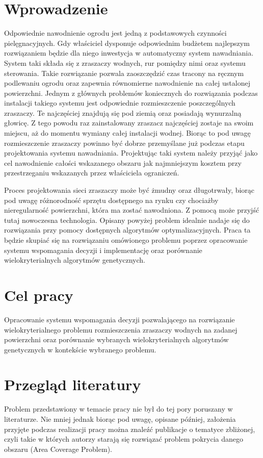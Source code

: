 \documentclass[twoside]{iisthesis}
\begin{document}
\section{Wprowadzenie}
Odpowiednie nawodnienie ogrodu jest jedną z podstawowych czynności pielęgnacyjnych. Gdy właściciel dysponuje odpowiednim budżetem najlepszym rozwiązaniem będzie dla niego inwestycja w automatyczny system nawadniania. System taki składa się z zraszaczy wodnych, rur pomiędzy nimi oraz systemu sterowania. Takie rozwiązanie pozwala zaoszczędzić czas tracony na ręcznym podlewaniu ogrodu oraz zapewnia równomierne nawodnienie na całej ustalonej powierzchni. Jednym z głównych problemów koniecznych do rozwiązania podczas instalacji takiego systemu jest odpowiednie rozmieszczenie poszczególnych zraszaczy. Te najczęściej znajdują się pod ziemią oraz posiadają wynurzalną głowicę. Z tego powodu raz zainstalowany zraszacz najczęściej zostaje na swoim miejscu, aż do momentu wymiany całej instalacji wodnej. Biorąc to pod uwagę rozmieszczenie zraszaczy powinno być dobrze przemyślane już podczas etapu projektowania systemu nawadniania. Projektując taki system należy przyjąć jako cel nawodnienie całości wskazanego obszaru jak najmniejszym kosztem przy przestrzeganiu wskazanych przez właściciela ograniczeń.

Proces projektowania sieci zraszaczy może być żmudny oraz długotrwały, biorąc pod uwagę różnorodność sprzętu dostępnego na rynku czy chociażby nieregularność powierzchni, która ma zostać nawodniona. Z pomocą może przyjść tutaj nowoczesna technologia. Opisany powyżej problem idealnie nadaje się do rozwiązania przy pomocy dostępnych algorytmów optymalizacyjnych. Praca ta będzie skupiać się na rozwiązaniu omówionego problemu poprzez opracowanie systemu wspomagania decyzji i implementację oraz porównanie wielokryterialnych algorytmów genetycznych.

\section{Cel pracy}
Opracowanie systemu wspomagania decyzji pozwalającego na rozwiązanie wielokryterialnego problemu rozmieszczenia zraszaczy wodnych na zadanej powierzchni oraz porównanie wybranych wielokryterialnych algorytmów genetycznych w kontekście wybranego problemu.

\section{Przegląd literatury}
Problem przedstawiony w temacie pracy nie był do tej pory poruszany w literaturze. Nie mniej jednak biorąc pod uwagę, opisane później, założenia przyjęte podczas realizacji pracy można znaleźć publikacje o tematyce zbliżonej, czyli takie w których autorzy starają się rozwiązać problem pokrycia danego obszaru (Area Coverage Problem).
\end{document}
